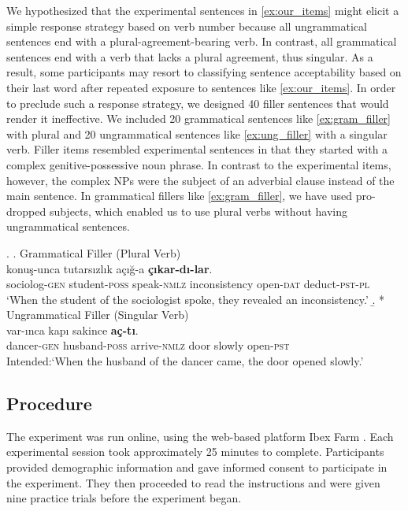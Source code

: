 \documentclass[brill,linguex]{glossa}\usepackage[]{graphicx}\usepackage[]{color}
\begin{document}
We hypothesized that the experimental sentences in \ref{ex:our_items} might elicit a simple response strategy based on verb number because all ungrammatical sentences end with a plural-agreement-bearing verb. In contrast, all grammatical sentences end with a verb that lacks a plural agreement, thus singular. As a result, some participants may resort to classifying sentence acceptability based on their last word after repeated exposure to sentences like \ref{ex:our_items}. In order to preclude such a response strategy, we designed 40 filler sentences that would render it ineffective. We included 20 grammatical sentences like \ref{ex:gram_filler} with plural and 20 ungrammatical sentences like \ref{ex:ung_filler} with a singular verb. Filler items resembled experimental sentences in that they started with a complex genitive-possessive noun phrase. In contrast to the experimental items, however, the complex NPs were the subject of an adverbial clause instead of the main sentence. In grammatical fillers like \ref{ex:gram_filler}, we have used pro-dropped subjects, which enabled us to use plural verbs without having ungrammatical sentences. 


\ex. \label{ex:fillers}
  \a. Grammatical Filler (Plural Verb) \label{ex:gram_filler}\\
   konu\c{s}-unca tutars{\i}zl{\i}k a\c{c}{\i}\u{g}-a \textbf{\c{c}{\i}kar-d{\i}-lar}.\\ 
  sociolog-\textsc{gen}  student-\textsc{poss} speak-\textsc{nmlz} inconsistency  open-\textsc{dat} deduct-\textsc{pst}-\textsc{pl}\\
  \glt `When the student of the sociologist spoke, they revealed an inconsistency.'
  \b. * Ungrammatical Filler (Singular Verb) \label{ex:ung_filler}\\
   var-{\i}nca kap{\i} sakince \textbf{a\c{c}-t{\i}}. \\
  dancer-\textsc{gen}  husband-\textsc{poss} arrive-\textsc{nmlz} door slowly  open-\textsc{pst}\\
  \glt Intended:`When the husband of the dancer came, the door opened slowly.'


\subsection{Procedure}

The experiment was run online, using the web-based platform Ibex Farm \citep{Drummond2013}. Each experimental session took approximately 25 minutes to complete. Participants provided demographic information and gave informed consent to participate in the experiment. They then proceeded to read the instructions and were given nine practice trials before the experiment began.
\end{document}
